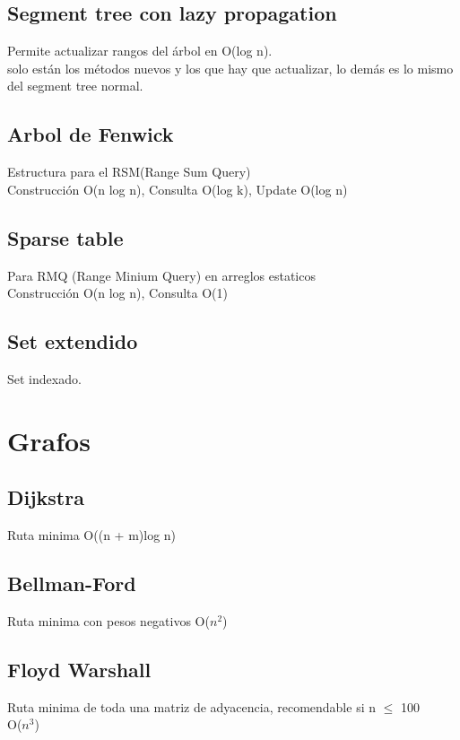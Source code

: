 \documentclass[10pt,landscape,twocolumn,a4paper,notitlepage]{article}
\newcommand\cppfile[2][]{

}
\begin{document}
			\subsection{Segment tree con lazy propagation}
			Permite actualizar rangos del árbol en O(log n).\\
			solo están los métodos nuevos y los que hay que actualizar, lo demás es lo mismo del segment tree normal.
			\cppfile[29-84]{estructuras_de_datos/segment_tree_lazy_propagation.cpp}
			\subsection{Arbol de Fenwick}
			Estructura para el RSM(Range Sum Query)\\
			Construcción O(n log n), Consulta O(log k), Update O(log n)
			\cppfile[8-35]{estructuras_de_datos/arbol_binario_indexado.cpp}
			\subsection{Sparse table}
			Para RMQ (Range Minium Query) en arreglos estaticos\\
			Construcción O(n log n), Consulta O(1)
			\cppfile[8-35]{estructuras_de_datos/Sparse_table.cpp}
			\subsection{Set extendido}
			Set indexado.
			\cppfile[2-10]{estructuras_de_datos/set_extendido.cpp}
			
		\section{Grafos}
			\subsection{Dijkstra}
			Ruta minima
			O((n + m)log n)
			\cppfile[12-46]{grafos/dijkstra.cpp}
			\subsection{Bellman-Ford}
			Ruta minima con pesos negativos
			O($n^{2}$)
			\cppfile[12-33]{grafos/bellman-Ford.cpp}
			\subsection{Floyd Warshall}
			Ruta minima de toda una matriz de adyacencia, recomendable si n $\leq$ 100\\	
			O($n^{3}$)
			\cppfile[8-36]{grafos/floyd.cpp}
\end{document}
